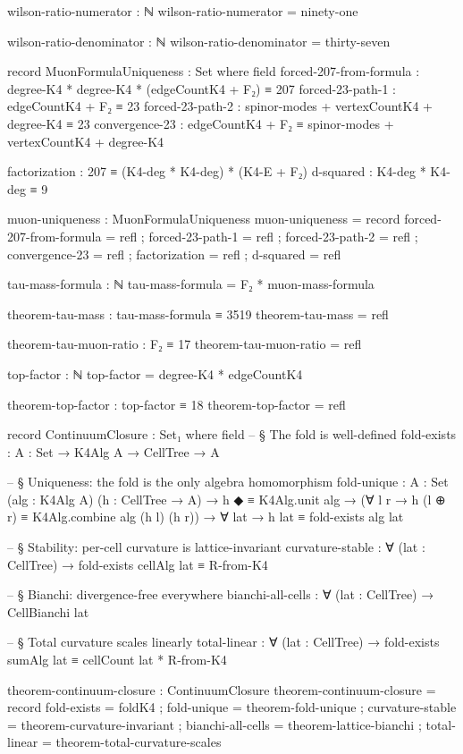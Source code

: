 \documentclass[11pt,a4paper]{book}
\begin{document}
\begin{code}
wilson-ratio-numerator : ℕ
wilson-ratio-numerator = ninety-one

wilson-ratio-denominator : ℕ  
wilson-ratio-denominator = thirty-seven

record MuonFormulaUniqueness : Set where
  field
    forced-207-from-formula : degree-K4 * degree-K4 * (edgeCountK4 + F₂) ≡ 207
    forced-23-path-1        : edgeCountK4 + F₂ ≡ 23
    forced-23-path-2        : spinor-modes + vertexCountK4 + degree-K4 ≡ 23
    convergence-23          : edgeCountK4 + F₂ ≡ spinor-modes + vertexCountK4 + degree-K4
    
    factorization : 207 ≡ (K4-deg * K4-deg) * (K4-E + F₂)
    d-squared : K4-deg * K4-deg ≡ 9

muon-uniqueness : MuonFormulaUniqueness
muon-uniqueness = record
  { forced-207-from-formula = refl
  ; forced-23-path-1 = refl
  ; forced-23-path-2 = refl
  ; convergence-23 = refl
  ; factorization = refl
  ; d-squared = refl
  }

tau-mass-formula : ℕ
tau-mass-formula = F₂ * muon-mass-formula

theorem-tau-mass : tau-mass-formula ≡ 3519
theorem-tau-mass = refl

theorem-tau-muon-ratio : F₂ ≡ 17
theorem-tau-muon-ratio = refl

top-factor : ℕ
top-factor = degree-K4 * edgeCountK4

theorem-top-factor : top-factor ≡ 18
theorem-top-factor = refl

record ContinuumClosure : Set₁ where
  field
    -- § The fold is well-defined
    fold-exists   : {A : Set} → K4Alg A → CellTree → A

    -- § Uniqueness: the fold is the only algebra homomorphism
    fold-unique   : {A : Set} (alg : K4Alg A) (h : CellTree → A) →
                    h ◆ ≡ K4Alg.unit alg →
                    (∀ l r → h (l ⊕ r) ≡ K4Alg.combine alg (h l) (h r)) →
                    ∀ lat → h lat ≡ fold-exists alg lat

    -- § Stability: per-cell curvature is lattice-invariant
    curvature-stable : ∀ (lat : CellTree) →
                       fold-exists cellAlg lat ≡ R-from-K4

    -- § Bianchi: divergence-free everywhere
    bianchi-all-cells : ∀ (lat : CellTree) → CellBianchi lat

    -- § Total curvature scales linearly
    total-linear     : ∀ (lat : CellTree) →
                       fold-exists sumAlg lat ≡ cellCount lat * R-from-K4

theorem-continuum-closure : ContinuumClosure
theorem-continuum-closure = record
  { fold-exists      = foldK4
  ; fold-unique      = theorem-fold-unique
  ; curvature-stable = theorem-curvature-invariant
  ; bianchi-all-cells = theorem-lattice-bianchi
  ; total-linear     = theorem-total-curvature-scales
  }



\end{code}
\end{document}
